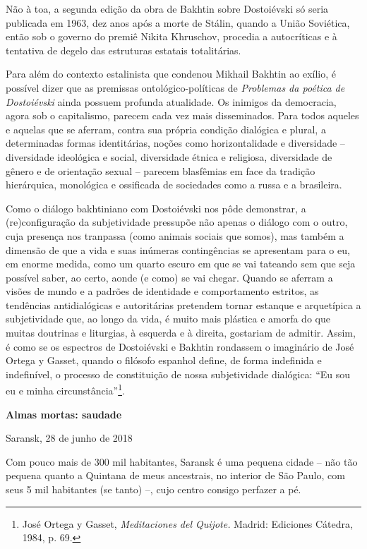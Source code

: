 Não à toa, a segunda edição da obra de Bakhtin sobre Dostoiévski só
seria publicada em 1963, dez anos após a morte de Stálin, quando a União
Soviética, então sob o governo do premiê Nikita Khruschov, procedia a
autocríticas e à tentativa de degelo das estruturas estatais
totalitárias.

Para além do contexto estalinista que condenou Mikhail Bakhtin ao
exílio, é possível dizer que as premissas ontológico-políticas de
\emph{Problemas da poética de Dostoiévski} ainda possuem profunda
atualidade. Os inimigos da democracia, agora sob o capitalismo, parecem
cada vez mais disseminados. Para todos aqueles e aquelas que se aferram,
contra sua própria condição dialógica e plural, a determinadas formas
identitárias, noções como horizontalidade e diversidade -- diversidade
ideológica e social, diversidade étnica e religiosa, diversidade de
gênero e de orientação sexual -- parecem blasfêmias em face da tradição
hierárquica, monológica e ossificada de sociedades como a russa e a
brasileira.

Como o diálogo bakhtiniano com Dostoiévski nos pôde demonstrar, a
(re)configuração da subjetividade pressupõe não apenas o diálogo com o
outro, cuja presença nos tranpassa (como animais sociais que somos), mas
também a dimensão de que a vida e suas inúmeras contingências se
apresentam para o eu, em enorme medida, como um quarto escuro em que se
vai tateando sem que seja possível saber, ao certo, aonde (e como) se
vai chegar. Quando se aferram a visões de mundo e a padrões de
identidade e comportamento estritos, as tendências antidialógicas e
autoritárias pretendem tornar estanque e arquetípica a subjetividade
que, ao longo da vida, é muito mais plástica e amorfa do que muitas
doutrinas e liturgias, à esquerda e à direita, gostariam de admitir.
Assim, é como se os espectros de Dostoiévski e Bakhtin rondassem o
imaginário de José Ortega y Gasset, quando o filósofo espanhol define,
de forma indefinida e indefinível, o processo de constituição de nossa
subjetividade dialógica: ``Eu sou eu e minha circunstância''\footnote{José
  Ortega y Gasset, \emph{Meditaciones del Quijote.} Madrid: Ediciones
  Cátedra, 1984, p. 69.}.

\textbf{Almas mortas: saudade}

Saransk, 28 de junho de 2018

Com pouco mais de 300 mil habitantes, Saransk é uma pequena cidade --
não tão pequena quanto a Quintana de meus ancestrais, no interior de São
Paulo, com seus 5 mil habitantes (se tanto) --, cujo centro consigo
perfazer a pé.

